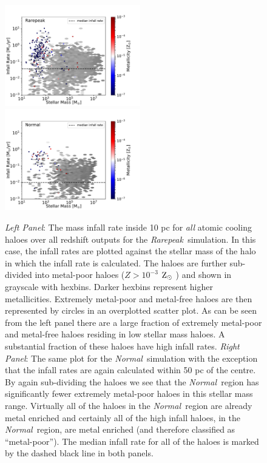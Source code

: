 \documentclass[graphics, twocolumn, usenatbib]{mn2e}
\newcommand{\zsolar} {$\rm{Z_{\odot}}~$}
\newcommand{\rarepeak} {\textit{Rarepeak~}}
\newcommand{\normal} {\textit{Normal~}}
\begin{document}
\begin{figure}
\end{figure}
\begin{figure}
\centering
\begin{minipage}{175mm}      \begin{center} 
\centerline{
\includegraphics[width=0.525\textwidth]{FIGURES/Rarepeak_MdotMstellarZ_Hexbin.pdf}
\includegraphics[width=0.525\textwidth]{FIGURES/Normal_MdotMstellarZ_Hexbin.pdf}}
\caption{\textit{Left Panel}: The mass infall rate inside 10 pc for \textit{all} atomic
  cooling haloes over all redshift outputs for the \rarepeak simulation. In this case,
  the infall rates are plotted against the stellar mass of the halo in which the infall rate is
  calculated. The haloes are further sub-divided into metal-poor haloes ($Z > 10^{-3}$ \zsolar)
  and shown in grayscale with hexbins. Darker hexbins represent higher metallicities.
  Extremely metal-poor and metal-free
  haloes are then represented by circles in
  an overplotted scatter plot. As can be seen from the left panel there are a large fraction of
  extremely metal-poor and metal-free haloes residing in low stellar mass haloes. A substantial
  fraction of these haloes have high infall rates. 
  \textit{Right Panel}: The same plot for the \normal simulation with the exception that the
  infall rates are  again calculated within 50 pc of the centre. By again sub-dividing the haloes
  we see that the \normal region has significantly fewer extremely metal-poor haloes in this stellar
  mass range. Virtually all of the
  haloes in the \normal region are already metal enriched and certainly all of the high infall haloes,
  in the \normal region, are metal enriched (and therefore classified as ``metal-poor''). 
  The median infall rate for all of the haloes is marked by the dashed black line in both panels.}
\label{Fig:StellarMass}
\end{center} \end{minipage}

\end{figure}
\end{document}
